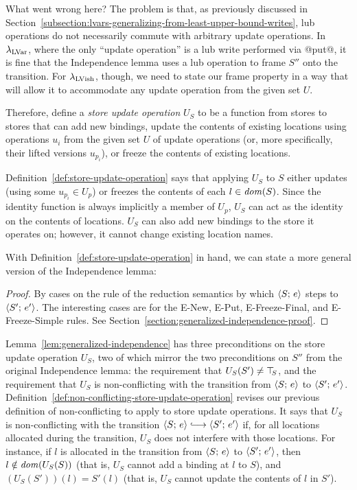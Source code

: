 What went wrong here?  The problem is that, as previously discussed in
Section~\ref{subsection:lvars-generalizing-from-least-upper-bound-writes},
lub operations do not necessarily commute with arbitrary update
operations.  In $\lambda_{\textrm{LVar}}$, where the only ``update operation'' is
a lub write performed via @put@, it is fine that the Independence
lemma uses a lub operation to frame $S''$ onto the transition. For
$\lambda_{\textrm{LVish}}$, though, we need to state our frame property in a way
that will allow it to accommodate any update operation from the given
set $U$.

Therefore,  define a \emph{store update operation} $U_S$ to be a
function from stores to stores that can add new bindings, update the
contents of existing locations using operations $u_i$ from the given
set $U$ of update operations (or, more specifically, their lifted
versions $u_{p_i}$), or freeze the contents of existing locations.

\DefStoreUpdateOperation

Definition~\ref{def:store-update-operation} says that applying $U_S$
to $S$ either updates (using some $u_{p_i} \in U_p$) or freezes the
contents of each $l \in \mathit{dom}(S)$.  Since the identity function is
always implicitly a member of $U_p$, $U_S$ can act as the identity on
the contents of locations.  $U_S$ can also add new bindings to the
store it operates on; however, it cannot change existing location
names.

With Definition~\ref{def:store-update-operation} in hand, we can state
a more general version of the Independence lemma:

\LemGeneralizedIndependence
\ifdefined\DISSERTATION
\begin{proof}
  By cases on the rule of the reduction semantics by which
  $\langle S;\, e \rangle$ steps to $\langle S';\, e' \rangle$.  The interesting cases
  are for the {\sc E-New}, {\sc E-Put}, {\sc E-Freeze-Final}, and {\sc
    E-Freeze-Simple} rules.  See
  Section~\ref{section:generalized-independence-proof}.
\end{proof}
\fi

Lemma~\ref{lem:generalized-independence} has three preconditions on
the store update operation $U_S$, two of which mirror the two
preconditions on $S''$ from the original Independence lemma: the
requirement that $U_S(S') \neq \top\hspace{-0.85mm}_{S}$, and the requirement that $U_S$
is non-conflicting with the transition from $\langle S;\, e \rangle$ to
$\langle S';\, e' \rangle$.
Definition~\ref{def:non-conflicting-store-update-operation} revises
our previous definition of non-conflicting to apply to store update
operations.  It says that $U_S$ is non-conflicting with the transition
$\config{S}{e} \parstepsto \config{S'}{e'}$ if, for all locations
allocated during the transition, $U_S$ does not interfere with those
locations.  For instance, if $l$ is allocated in the transition from
$\langle S;\, e \rangle$ to $\langle S';\, e' \rangle$, then $l \notin \mathit{dom}(U_S(S))$
(that is, $U_S$ cannot add a binding at $l$ to $S$), and $(U_S(S'))(l)
= S'(l)$ (that is, $U_S$ cannot update the contents of $l$ in $S'$).

